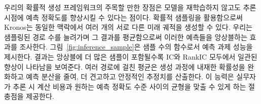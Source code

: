 우리의 확률적 생성 프레임워크의 주목할 만한 장점은 모델을 재학습하지 않고도 추론 시점에 예측 정확도를 향상시킬 수 있다는 점이다. 확률적 샘플링을 활용함으로써 Kronos는 동일한 맥락에서 여러 개의 서로 다른 미래 궤적을 생성할 수 있다. 우리는 샘플링된 경로 수를 늘려가며 그 결과를 평균함으로써 이러한 예측들을 앙상블하는 효과를 조사한다. 그림~\ref{fig:inference_sample}은 샘플 수의 함수로서 예측 과제 성능을 제시한다. 결과는 앙상블에 더 많은 샘플이 포함될수록 IC와 RankIC 모두에서 일관된 향상이 나타남을 보여준다. 여러 경로에 걸친 평균은 생성 과정에 내재한 확률성을 완화하고 예측 분산을 줄여, 더 견고하고 안정적인 추정치를 산출한다. 이 능력은 실무자가 추론 시 계산 비용과 원하는 예측 정확도 수준 사이의 균형을 맞출 수 있게 하는 절충점을 제공한다.
